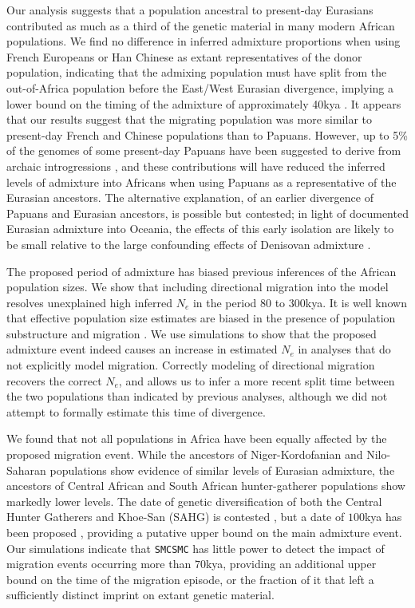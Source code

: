 \documentclass{article}
\begin{document}
Our analysis suggests that a population ancestral to present-day Eurasians contributed as much as a third of the genetic material in many modern African populations. We find no difference in inferred admixture proportions when using French Europeans or Han Chinese as extant representatives of the donor population, indicating that the admixing population must have split from the out-of-Africa population before the East/West Eurasian divergence, implying a lower bound on the timing of the admixture of approximately 40kya \cite{Mathieson2014}. It appears that our results suggest that the migrating population was more similar to present-day French and Chinese populations than to Papuans.  However, up to 5\% of the genomes of some present-day Papuans have been suggested to derive from archaic introgressions \cite{Sankararaman2016}, and these contributions will have reduced the inferred levels of admixture into Africans when using Papuans as a representative of the Eurasian ancestors.
The alternative explanation, of an earlier divergence of Papuans and Eurasian ancestors, is possible but contested; in light of documented Eurasian admixture into Oceania, the effects of this early isolation are likely to be small relative to the large confounding effects of Denisovan admixture \cite{Malaspinas2016, Nielsen2017a}.

The proposed period of admixture has biased previous inferences of the African population sizes. We show that including directional migration into the model resolves unexplained high inferred $N_e$ in the period $80$ to $300$kya. It is well known that effective population size estimates are biased in the presence of population substructure and migration \cite{Chikhi2018, Li2011}. We use simulations to show that the proposed admixture event indeed causes an increase in estimated $N_e$ in analyses that do not explicitly model migration.  Correctly modeling of directional migration recovers the correct $N_e$, and allows us to infer a more recent split time between the two populations than indicated by previous analyses, although we did not attempt to formally estimate this time of divergence.

We found that not all populations in Africa have been equally affected by the proposed migration event. While the ancestors of Niger-Kordofanian and Nilo-Saharan populations show evidence of similar levels of Eurasian admixture, the ancestors of Central African and South African hunter-gatherer populations show markedly lower levels.  The date of genetic diversification of both the Central Hunter Gatherers and Khoe-San (SAHG) is contested \cite{Lipson2019}, but a date of $100$kya has been proposed \cite{Schlebusch2012}, providing a putative upper bound on the main admixture event.  Our simulations indicate that {\tt SMCSMC} has little power to detect the impact of migration events occurring more than $70$kya, providing an additional upper bound on the time of the migration episode, or the fraction of it that left a sufficiently distinct imprint on extant genetic material.
\end{document}
